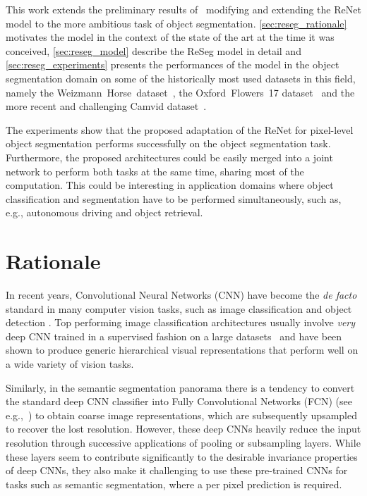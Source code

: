 This work extends the preliminary results of~\cite{visin2015renet} modifying
and extending the ReNet model to the more ambitious task of object
segmentation. \autoref{sec:reseg_rationale} motivates the model in the context
of the state of the art at the time it was conceived, \autoref{sec:reseg_model}
describe the ReSeg model in detail and \autoref{sec:reseg_experiments} presents
the performances of the model in the object segmentation domain on some of the
historically most used datasets in this field, namely the
Weizmann~Horse~dataset~\cite{Borenstein04combiningtop-down}, the
Oxford~Flowers~17 dataset~\cite{Nilsback06} and the more recent and challenging
Camvid dataset~\citep{Brostow2010semantic,BrostowECCV08}.

The experiments show that the proposed adaptation of the ReNet for pixel-level
object segmentation performs successfully on the object segmentation task.
Furthermore, the proposed architectures could be easily merged into a joint
network to perform both tasks at the same time, sharing most of the
computation. This could be interesting in application domains where object
classification and segmentation have to be performed simultaneously, such as,
e.g., autonomous driving and object retrieval.


\section{Rationale}\label{sec:reseg_rationale}

In recent years, Convolutional Neural Networks (CNN) have become the {\em de
facto} standard in many computer vision tasks, such as image classification and
object detection \cite{Krizhevsky-2012,Erhan2014}. Top performing image
classification architectures usually involve {\em very} deep CNN trained in a
supervised fashion on a large datasets~\cite{Lin2014,Simonyan2015,
szegedy2014going} and have been shown to produce generic hierarchical visual
representations that perform well on a wide variety of vision tasks.

Similarly, in the semantic segmentation panorama there is a tendency to convert
the standard deep CNN classifier into Fully Convolutional Networks (FCN) (see
e.g.,~\cite{long2014fully,noh2015learning, badrinarayanan2015segnet,
Ronneberger2015}) to obtain coarse image representations, which are
subsequently upsampled to recover the lost resolution. However, these deep CNNs
heavily reduce the input resolution through successive applications of pooling
or subsampling layers. While these layers seem to contribute significantly to
the desirable invariance properties of deep CNNs, they also make it challenging
to use these pre-trained CNNs for tasks such as semantic segmentation, where a
per pixel prediction is required.

